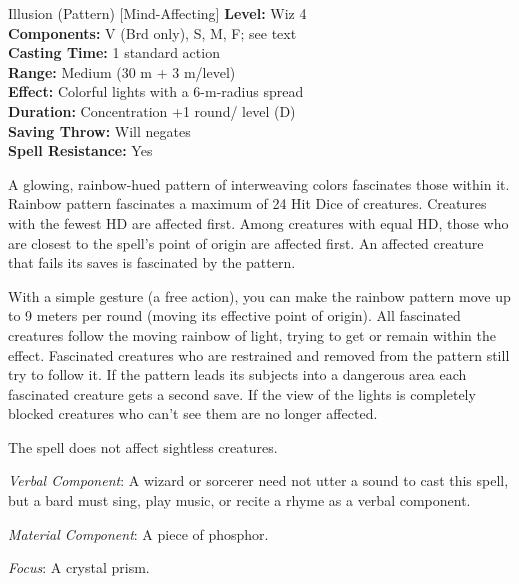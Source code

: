 {Illusion (Pattern) [Mind-Affecting]}
{
	\textbf{Level:}
	Wiz 4\\
	\textbf{Components:}
	V (Brd only), S, M, F; see text\\
	\textbf{Casting Time:}
	1 standard action\\
	\textbf{Range:}
	Medium (30 m + 3 m/level)\\
	\textbf{Effect:}
	Colorful lights with a 6-m-radius spread\\
	\textbf{Duration:}
	Concentration +1 round/ level (D)\\
	\textbf{Saving Throw:}
	Will negates\\
	\textbf{Spell Resistance:}
	Yes\\
}
{
	A glowing, rainbow-hued pattern of interweaving colors fascinates those within it. Rainbow pattern fascinates a maximum of 24 Hit Dice of creatures. Creatures with the fewest HD are affected first. Among creatures with equal HD, those who are closest to the spell's point of origin are affected first. An affected creature that fails its saves is fascinated by the pattern.

	With a simple gesture (a free action), you can make the rainbow pattern move up to 9 meters per round (moving its effective point of origin). All fascinated creatures follow the moving rainbow of light, trying to get or remain within the effect. Fascinated creatures who are restrained and removed from the pattern still try to follow it. If the pattern leads its subjects into a dangerous area each fascinated creature gets a second save. If the view of the lights is completely blocked creatures who can't see them are no longer affected.

	The spell does not affect sightless creatures.

	\textit{Verbal Component}:
	A wizard or sorcerer need not utter a sound to cast this spell, but a bard must sing, play music, or recite a rhyme as a verbal component.

	\textit{Material Component}:
	A piece of phosphor.

	\textit{Focus}:
	A crystal prism.

}
